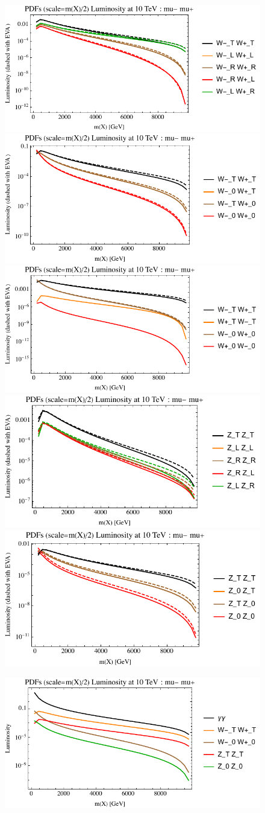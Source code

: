 \documentclass[a4paper,11pt]{article}
\begin{document}
\begin{figure}[ht]
\includegraphics[width=0.46\linewidth]{Notebooks/PlotLumi/10TeV/lumis/plotWWpolRandL.pdf}
\includegraphics[width=0.46\linewidth]{Notebooks/PlotLumi/10TeV/lumis/plotWWpolTand0.pdf}
\includegraphics[width=0.46\linewidth]{Notebooks/PlotLumi/10TeV/lumis/plotWmWpandWpWm.pdf}
\includegraphics[width=0.46\linewidth]{Notebooks/PlotLumi/10TeV/lumis/plotZZpolRandL.pdf}
\includegraphics[width=0.46\linewidth]{Notebooks/PlotLumi/10TeV/lumis/plotZZpolTand0.pdf}
\end{figure}

\begin{figure}
\includegraphics[width=0.46\linewidth]{Notebooks/PlotLumi/10TeV/lumis/plotgammaWZ.pdf}
\end{figure}
\end{document}
